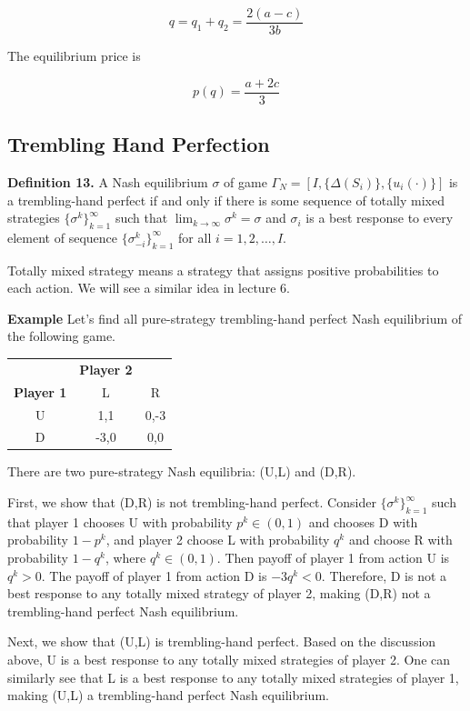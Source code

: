 \documentclass[12pt, oneside]{article}
\begin{document}
\[
q = q_1 + q_2 = \frac{2(a - c)}{3b}
\]

The equilibrium price is

\[
p(q) = \frac{a + 2c}{3}
\]

\subsection{Trembling Hand Perfection}

\textbf{Definition 13.} A Nash equilibrium $\sigma$ of game $\Gamma_N = [I, \{\Delta(S_i)\}, \{u_i(\cdot)\}]$ is a trembling-hand perfect if and only if there is some sequence of totally mixed strategies $\{\sigma^k\}_{k=1}^{\infty}$ such that $\lim_{k \to \infty} \sigma^k = \sigma$ and $\sigma_i$ is a best response to every element of sequence $\{\sigma_{-i}^k\}_{k=1}^{\infty}$ for all $i = 1,2, \dots, I$.

Totally mixed strategy means a strategy that assigns positive probabilities to each action. We will see a similar idea in lecture 6.

\textbf{Example}
Let's find all pure-strategy trembling-hand perfect Nash equilibrium of the following game.

\begin{center}
\begin{tabular}{c|cc}
 & \textbf{Player 2} & \\
\textbf{Player 1} & L & R \\
\hline
U & 1,1 & 0,-3 \\
D & -3,0 & 0,0 \\
\end{tabular}
\end{center}

There are two pure-strategy Nash equilibria: (U,L) and (D,R).

First, we show that (D,R) is not trembling-hand perfect. Consider $\{\sigma^k\}_{k=1}^{\infty}$ such that player 1 chooses U with probability $p^k \in (0,1)$ and chooses D with probability $1 - p^k$, and player 2 choose L with probability $q^k$ and choose R with probability $1 - q^k$, where $q^k \in (0,1)$. Then payoff of player 1 from action U is $q^k > 0$. The payoff of player 1 from action D is $-3q^k < 0$. Therefore, D is not a best response to any totally mixed strategy of player 2, making (D,R) not a trembling-hand perfect Nash equilibrium.

Next, we show that (U,L) is trembling-hand perfect. Based on the discussion above, U is a best response to any totally mixed strategies of player 2. One can similarly see that L is a best response to any totally mixed strategies of player 1, making (U,L) a trembling-hand perfect Nash equilibrium.
\end{document}
